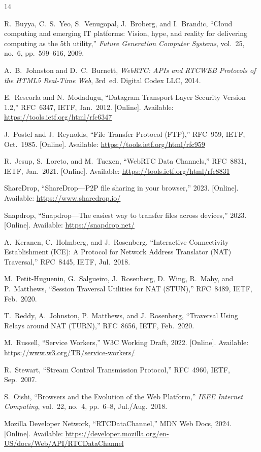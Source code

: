 \documentclass[conference]{IEEEtran}
\begin{document}
\begin{thebibliography}{14}

R.~Buyya, C.~S.~Yeo, S.~Venugopal, J.~Broberg, and I.~Brandic, ``Cloud computing and emerging IT platforms: Vision, hype, and reality for delivering computing as the 5th utility,'' \emph{Future Generation Computer Systems}, vol.~25, no.~6, pp.~599--616, 2009.

A.~B.~Johnston and D.~C.~Burnett, \emph{WebRTC: APIs and RTCWEB Protocols of the HTML5 Real-Time Web}, 3rd~ed. Digital Codex LLC, 2014.

E.~Rescorla and N.~Modadugu, ``Datagram Transport Layer Security Version 1.2,'' RFC~6347, IETF, Jan.~2012. [Online]. Available: \url{https://tools.ietf.org/html/rfc6347}

J.~Postel and J.~Reynolds, ``File Transfer Protocol (FTP),'' RFC~959, IETF, Oct.~1985. [Online]. Available: \url{https://tools.ietf.org/html/rfc959}

R.~Jesup, S.~Loreto, and M.~Tuexen, ``WebRTC Data Channels,'' RFC~8831, IETF, Jan.~2021. [Online]. Available: \url{https://tools.ietf.org/html/rfc8831}

ShareDrop, ``ShareDrop---P2P file sharing in your browser,'' 2023. [Online]. Available: \url{https://www.sharedrop.io/}

Snapdrop, ``Snapdrop---The easiest way to transfer files across devices,'' 2023. [Online]. Available: \url{https://snapdrop.net/}

A.~Keranen, C.~Holmberg, and J.~Rosenberg, ``Interactive Connectivity Establishment (ICE): A Protocol for Network Address Translator (NAT) Traversal,'' RFC~8445, IETF, Jul.~2018.

M.~Petit-Huguenin, G.~Salgueiro, J.~Rosenberg, D.~Wing, R.~Mahy, and P.~Matthews, ``Session Traversal Utilities for NAT (STUN),'' RFC~8489, IETF, Feb.~2020.

T.~Reddy, A.~Johnston, P.~Matthews, and J.~Rosenberg, ``Traversal Using Relays around NAT (TURN),'' RFC~8656, IETF, Feb.~2020.

M.~Russell, ``Service Workers,'' W3C Working Draft, 2022. [Online]. Available: \url{https://www.w3.org/TR/service-workers/}

R.~Stewart, ``Stream Control Transmission Protocol,'' RFC~4960, IETF, Sep.~2007.

S.~Oishi, ``Browsers and the Evolution of the Web Platform,'' \emph{IEEE Internet Computing}, vol.~22, no.~4, pp.~6--8, Jul./Aug.~2018.

Mozilla Developer Network, ``RTCDataChannel,'' MDN Web Docs, 2024. [Online]. Available: \url{https://developer.mozilla.org/en-US/docs/Web/API/RTCDataChannel}

\end{thebibliography}
\end{document}
